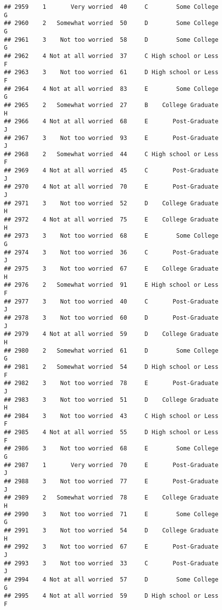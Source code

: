 \documentclass[
]{article}
\begin{document}
\begin{verbatim}
## 2959    1       Very worried  40     C        Some College         G
## 2960    2   Somewhat worried  50     D        Some College         G
## 2961    3    Not too worried  58     D        Some College         G
## 2962    4 Not at all worried  37     C High school or Less         F
## 2963    3    Not too worried  61     D High school or Less         F
## 2964    4 Not at all worried  83     E        Some College         G
## 2965    2   Somewhat worried  27     B    College Graduate         H
## 2966    4 Not at all worried  68     E       Post-Graduate         J
## 2967    3    Not too worried  93     E       Post-Graduate         J
## 2968    2   Somewhat worried  44     C High school or Less         F
## 2969    4 Not at all worried  45     C       Post-Graduate         J
## 2970    4 Not at all worried  70     E       Post-Graduate         J
## 2971    3    Not too worried  52     D    College Graduate         H
## 2972    4 Not at all worried  75     E    College Graduate         H
## 2973    3    Not too worried  68     E        Some College         G
## 2974    3    Not too worried  36     C       Post-Graduate         J
## 2975    3    Not too worried  67     E    College Graduate         H
## 2976    2   Somewhat worried  91     E High school or Less         F
## 2977    3    Not too worried  40     C       Post-Graduate         J
## 2978    3    Not too worried  60     D       Post-Graduate         J
## 2979    4 Not at all worried  59     D    College Graduate         H
## 2980    2   Somewhat worried  61     D        Some College         G
## 2981    2   Somewhat worried  54     D High school or Less         F
## 2982    3    Not too worried  78     E       Post-Graduate         J
## 2983    3    Not too worried  51     D    College Graduate         H
## 2984    3    Not too worried  43     C High school or Less         F
## 2985    4 Not at all worried  55     D High school or Less         F
## 2986    3    Not too worried  68     E        Some College         G
## 2987    1       Very worried  70     E       Post-Graduate         J
## 2988    3    Not too worried  77     E       Post-Graduate         J
## 2989    2   Somewhat worried  78     E    College Graduate         H
## 2990    3    Not too worried  71     E        Some College         G
## 2991    3    Not too worried  54     D    College Graduate         H
## 2992    3    Not too worried  67     E       Post-Graduate         J
## 2993    3    Not too worried  33     C       Post-Graduate         J
## 2994    4 Not at all worried  57     D        Some College         G
## 2995    4 Not at all worried  59     D High school or Less         F

\end{verbatim}
\end{document}
